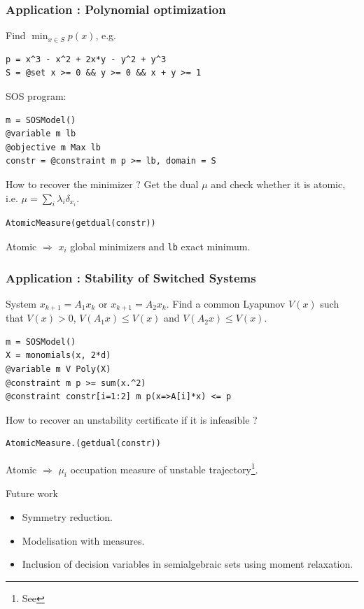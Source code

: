 \documentclass{beamer}
\begin{document}
  \begin{frame}[fragile]
    \frametitle{Application : Polynomial optimization}
      Find $\min_{x \in S} p(x)$, e.g.
\begin{verbatim}
p = x^3 - x^2 + 2x*y - y^2 + y^3
S = @set x >= 0 && y >= 0 && x + y >= 1
\end{verbatim}
      SOS program:
\begin{verbatim}
m = SOSModel()
@variable m lb
@objective m Max lb
constr = @constraint m p >= lb, domain = S
\end{verbatim}
      How to recover the minimizer ?
      Get the dual $\mu$ and check whether it is atomic, i.e.
      \( \mu = \sum_i \lambda_i \delta_{x_i} \).
\begin{verbatim}
AtomicMeasure(getdual(constr))
\end{verbatim}
      Atomic $\Rightarrow$ $x_i$ global minimizers and \verb|lb| exact minimum.
  \end{frame}
  \begin{frame}[fragile]
    \frametitle{Application : Stability of Switched Systems}
      System $x_{k+1} = A_1x_k$ or $x_{k+1} = A_2x_k$.
      Find a common Lyapunov $V(x)$ such that $V(x) > 0$, $V(A_1x) \leq V(x)$ and $V(A_2x) \leq V(x)$.
\begin{verbatim}
m = SOSModel()
X = monomials(x, 2*d)
@variable m V Poly(X)
@constraint m p >= sum(x.^2)
@constraint constr[i=1:2] m p(x=>A[i]*x) <= p
\end{verbatim}
      How to recover an unstability certificate if it is infeasible ?
\begin{verbatim}
AtomicMeasure.(getdual(constr))
\end{verbatim}
      Atomic $\Rightarrow$ $\mu_i$ occupation measure of unstable trajectory\footnote{See }.
  \end{frame}
  \begin{frame}{Future work}
    \begin{itemize}
      \item Symmetry reduction.
      \item Modelisation with measures.
      \item Inclusion of decision variables in semialgebraic sets using moment relaxation.
    \end{itemize}
  \end{frame}
\end{document}
